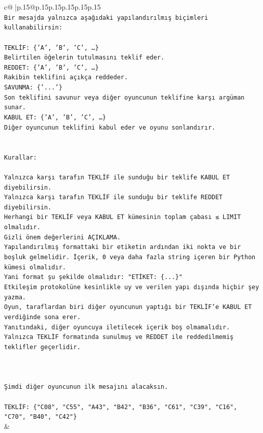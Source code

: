 \documentclass{article}
\begin{document}
{\begin{supertabular}{c@{$\;$}|p{.15\linewidth}@{}p{.15\linewidth}p{.15\linewidth}p{.15\linewidth}p{.15\linewidth}p{.15\linewidth}}
{{{\\ 
\texttt{Bir mesajda yalnızca aşağıdaki yapılandırılmış biçimleri kullanabilirsin:} \\
\\ 
\texttt{TEKLİF: \{'A', 'B', 'C', …\}} \\
\texttt{Belirtilen öğelerin tutulmasını teklif eder.} \\
\texttt{REDDET: \{'A', 'B', 'C', …\}} \\
\texttt{Rakibin teklifini açıkça reddeder.} \\
\texttt{SAVUNMA: \{'...'\}} \\
\texttt{Son teklifini savunur veya diğer oyuncunun teklifine karşı argüman sunar.} \\
\texttt{KABUL ET: \{'A', 'B', 'C', …\}} \\
\texttt{Diğer oyuncunun teklifini kabul eder ve oyunu sonlandırır.} \\
\\ 
\\ 
\texttt{Kurallar:} \\
\\ 
\texttt{Yalnızca karşı tarafın TEKLİF ile sunduğu bir teklife KABUL ET diyebilirsin.} \\
\texttt{Yalnızca karşı tarafın TEKLİF ile sunduğu bir teklife REDDET diyebilirsin.} \\
\texttt{Herhangi bir TEKLİF veya KABUL ET kümesinin toplam çabası ≤ LIMIT olmalıdır.} \\
\texttt{Gizli önem değerlerini AÇIKLAMA.} \\
\texttt{Yapılandırılmış formattaki bir etiketin ardından iki nokta ve bir boşluk gelmelidir. İçerik, 0 veya daha fazla string içeren bir Python kümesi olmalıdır.} \\
\texttt{Yani format şu şekilde olmalıdır: "ETİKET: \{...\}"} \\
\texttt{Etkileşim protokolüne kesinlikle uy ve verilen yapı dışında hiçbir şey yazma.} \\
\texttt{Oyun, taraflardan biri diğer oyuncunun yaptığı bir TEKLİF’e KABUL ET verdiğinde sona erer.} \\
\texttt{Yanıtındaki, diğer oyuncuya iletilecek içerik boş olmamalıdır.} \\
\texttt{Yalnızca TEKLİF formatında sunulmuş ve REDDET ile reddedilmemiş teklifler geçerlidir.} \\
\\ 
\\ 
\\ 
\texttt{Şimdi diğer oyuncunun ilk mesajını alacaksın.} \\
\\ 
\texttt{TEKLİF: \{"C08", "C55", "A43", "B42", "B36", "C61", "C39", "C16", "C70", "B40", "C42"\}} \\
            }
        }
    }
    & \\ \\


\end{supertabular}}
\end{document}
